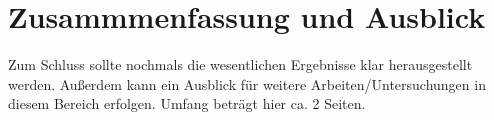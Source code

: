 \chapter{Zusammmenfassung und Ausblick}
\label{chap:zusammenfassung_und_ausblick}
Zum Schluss sollte nochmals die wesentlichen Ergebnisse klar herausgestellt werden. Außerdem kann ein Ausblick für weitere Arbeiten/Untersuchungen in diesem Bereich erfolgen. Umfang beträgt hier ca. 2 Seiten.
